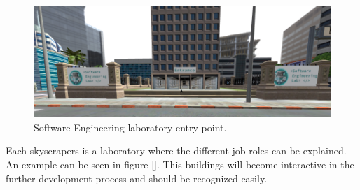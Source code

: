 \begin{figure}[h!]
  \includegraphics[width=16cm]{kapitel/software-building.PNG}
  \centering
  \caption{Software Engineering laboratory entry point.}
  \label{fig:game-world-scene}
\end{figure}
Each skyscrapers is a laboratory where the different job roles can be explained. An example can be seen in figure \ref{}. This buildings will become interactive in the further development process and should be recognized easily.
